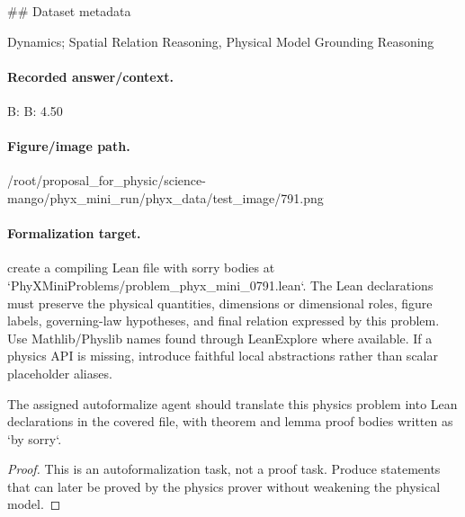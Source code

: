 \#\# Dataset metadata

Dynamics; Spatial Relation Reasoning, Physical Model Grounding Reasoning

\paragraph{Recorded answer/context.}
B: B: 4.50

\paragraph{Figure/image path.}
/root/proposal\_for\_physic/science-mango/phyx\_mini\_run/phyx\_data/test\_image/791.png

\paragraph{Formalization target.}
create a compiling Lean file with sorry bodies at `PhyXMiniProblems/problem\_phyx\_mini\_0791.lean`. The Lean declarations must preserve the physical quantities, dimensions or dimensional roles, figure labels, governing-law hypotheses, and final relation expressed by this problem.
Use Mathlib/Physlib names found through LeanExplore where available. If a physics API is missing, introduce faithful local abstractions rather than scalar placeholder aliases.

\begin{theorem}
\label{thm:physics:phyx_mini_0791:target}
The assigned autoformalize agent should translate this physics problem into Lean declarations in the covered file, with theorem and lemma proof bodies written as `by sorry`.
\end{theorem}
\begin{proof}
This is an autoformalization task, not a proof task. Produce statements that can later be proved by the physics prover without weakening the physical model.
\end{proof}

